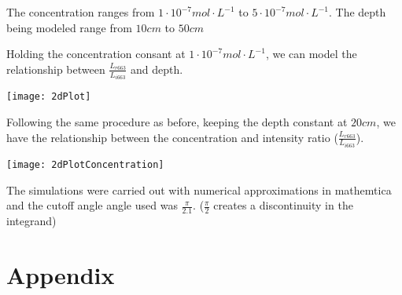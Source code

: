 \documentclass{article}
\begin{document}
The concentration ranges from $ 1 \cdot 10^{-7} mol\cdot L^{-1}$ to $5 \cdot 10^{-7} mol\cdot L^{-1}$. The depth being modeled
range from $10cm$ to $ 50cm$

Holding the concentration consant at $ 1 \cdot 10^{-7} mol\cdot L^{-1}$, we can model the
relationship between $ \frac{L_{r663}}{L_{i663}}$ and depth.
\begin{center}
    \texttt{[image: 2dPlot]}
\end{center}

Following the same procedure as before, keeping the depth constant at $ 20 cm$, we have the relationship between the
concentration and intensity ratio ($ \frac{L_{r663}}{L_{i663}}$).
\begin{center}
  \texttt{[image: 2dPlotConcentration]}
\end{center}

The simulations were carried out with numerical approximations in mathemtica and the cutoff angle angle used was $ \frac{\pi}{2.1}$.
($\frac{\pi}{2}$ creates a discontinuity in the integrand)
\section{Appendix}
\end{document}
